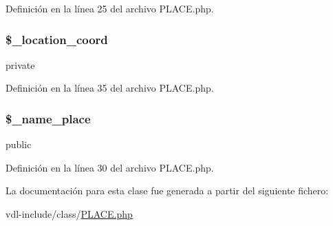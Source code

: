 Definición en la línea 25 del archivo P\-L\-A\-C\-E.\-php.

\hypertarget{classPLACE_a1d8307db55f9b8f1b2e1a5730c5d39a3}{
\subsubsection[{\$\-\_\-location\-\_\-coord}]{\setlength{\rightskip}{0pt plus 5cm}\$\-\_\-location\-\_\-coord}}\label{classPLACE_a1d8307db55f9b8f1b2e1a5730c5d39a3}
private 

Definición en la línea 35 del archivo P\-L\-A\-C\-E.\-php.

\hypertarget{classPLACE_ab605e159ffb78f4b4cabe8c76dd99775}{
\subsubsection[{\$\-\_\-name\-\_\-place}]{\setlength{\rightskip}{0pt plus 5cm}\$\-\_\-name\-\_\-place}}\label{classPLACE_ab605e159ffb78f4b4cabe8c76dd99775}
public 

Definición en la línea 30 del archivo P\-L\-A\-C\-E.\-php.



La documentación para esta clase fue generada a partir del siguiente fichero\-:\begin{DoxyCompactItemize}
\item 
vdl-\/include/class/\hyperlink{PLACE_8php}{P\-L\-A\-C\-E.\-php}\end{DoxyCompactItemize}
